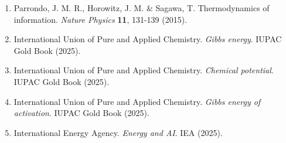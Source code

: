 \begin{enumerate}
\item
  Parrondo, J. M. R., Horowitz, J. M. \& Sagawa, T. Thermodynamics of
  information. \emph{Nature Physics} \textbf{11}, 131-139 (2015).
\item
  International Union of Pure and Applied Chemistry. \emph{Gibbs
  energy}. IUPAC Gold Book (2025).
\item
  International Union of Pure and Applied Chemistry. \emph{Chemical
  potential}. IUPAC Gold Book (2025).
\item
  International Union of Pure and Applied Chemistry. \emph{Gibbs energy
  of activation}. IUPAC Gold Book (2025).
\item
  International Energy Agency. \emph{Energy and AI}. IEA (2025).
\end{enumerate}
